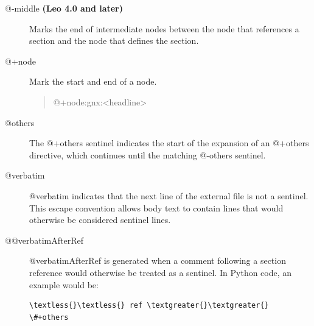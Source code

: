 \documentclass[a4paper,10pt,english]{sphinxmanual}
\begin{document}
\begin{description}
\item[{@-middle \textbf{(Leo 4.0 and later)}}] \leavevmode
Marks the end of intermediate nodes between the node that
references a section and the node that defines the section.

\item[{@+node}] \leavevmode
Mark the start and end of a node.
\begin{quote}

@+node:gnx:\textless{}headline\textgreater{}
\end{quote}

\item[{@others}] \leavevmode
The @+others sentinel indicates the start of the expansion of an @+others directive,
which continues until the matching @-others sentinel.

\item[{@verbatim}] \leavevmode
@verbatim indicates that the next line of the external file is not a sentinel.
This escape convention allows body text to contain lines that would otherwise
be considered sentinel lines.

\item[{@@verbatimAfterRef}] \leavevmode
@verbatimAfterRef is generated when a comment following a section reference would
otherwise be treated as a sentinel. In Python code, an example would be:

\begin{Verbatim}[commandchars=\\\{\}]
\textless{}\textless{} ref \textgreater{}\textgreater{} \#+others
\end{Verbatim}

\end{description}
\end{document}
